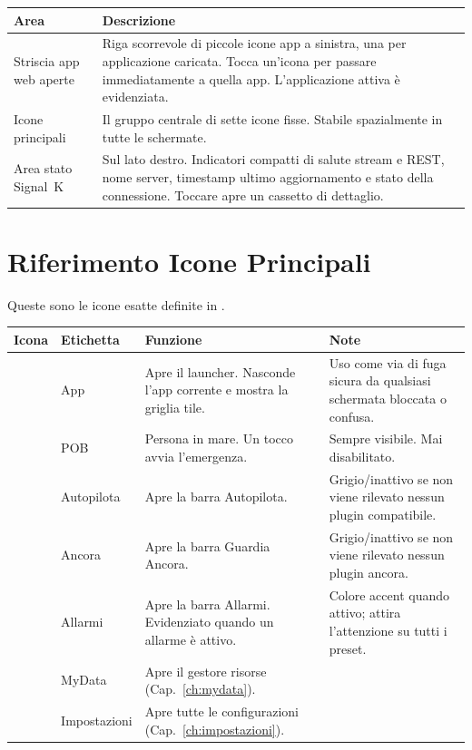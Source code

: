 \begin{longtable}{L{3.6cm}L{10.1cm}}
\toprule
{}
\color{white}\sffamily\bfseries Area &
\color{white}\sffamily\bfseries Descrizione \\
\midrule
Striscia app web aperte &
  Riga scorrevole di piccole icone app a sinistra, una per applicazione caricata.
  Tocca un'icona per passare immediatamente a quella app.
  L'applicazione attiva è evidenziata. \\
Icone principali &
  Il gruppo centrale di sette icone fisse. Stabile spazialmente in tutte le schermate. \\
Area stato Signal~K &
  Sul lato destro. Indicatori compatti di salute stream e REST, nome server,
  timestamp ultimo aggiornamento e stato della connessione.
  Toccare apre un cassetto di dettaglio. \\
\bottomrule
\end{longtable}

\section{Riferimento Icone Principali}

Queste sono le icone esatte definite in .

\begin{longtable}{C{1.4cm}L{2.4cm}L{5.4cm}L{4.5cm}}
\toprule
{}
\color{white}\sffamily\bfseries Icona &
\color{white}\sffamily\bfseries Etichetta &
\color{white}\sffamily\bfseries Funzione &
\color{white}\sffamily\bfseries Note \\
\midrule
{}     & App         &
  Apre il launcher. Nasconde l'app corrente e mostra la griglia tile. &
  Uso come via di fuga sicura da qualsiasi schermata bloccata o confusa. \\
        & POB         &
  Persona in mare. Un tocco avvia l'emergenza. &
  Sempre visibile. Mai disabilitato. \\
& Autopilota  &
  Apre la barra Autopilota. &
  Grigio/inattivo se non viene rilevato nessun plugin compatibile. \\
       & Ancora      &
  Apre la barra Guardia Ancora. &
  Grigio/inattivo se non viene rilevato nessun plugin ancora. \\
    & Allarmi     &
  Apre la barra Allarmi. Evidenziato quando un allarme è attivo. &
  Colore accent quando attivo; attira l'attenzione su tutti i preset. \\
         & MyData      &
  Apre il gestore risorse (Cap.~\ref{ch:mydata}). & \\
     & Impostazioni &
  Apre tutte le configurazioni (Cap.~\ref{ch:impostazioni}). & \\
\bottomrule
\end{longtable}

